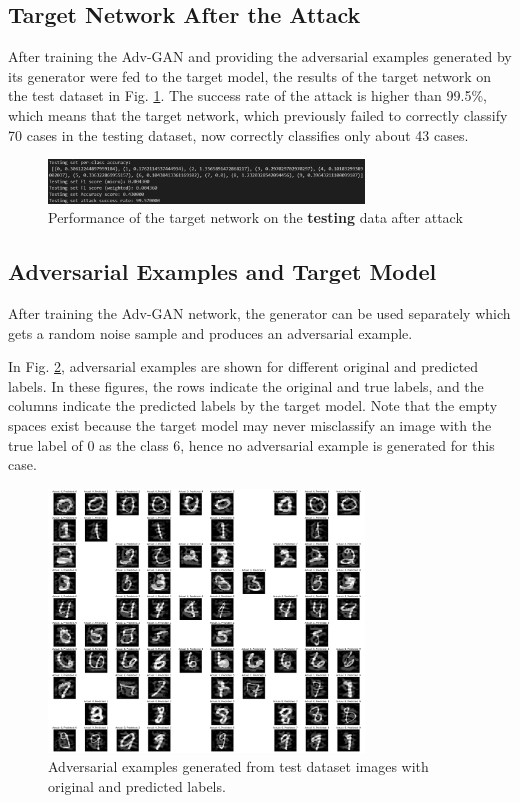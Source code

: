 \documentclass[lettersize,journal]{IEEEtran}
\begin{document}
\subsection*{Target Network After the Attack}
After training the Adv-GAN  and providing the adversarial examples generated by its generator  were fed to the target model, the results of the target network on the test dataset in Fig. \ref{testset_statistics}. The success rate of the attack is higher than 99.5\%, which means that the target network, which previously failed to correctly classify 70 cases in the testing dataset, now correctly classifies only about 43 cases.

\begin{figure}[!t]
\centering
\includegraphics[width=3.3in]{testset_statistics.PNG}
\caption{Performance of the target network on the \textbf{testing} data after attack}
\label{testset_statistics}
\end{figure}

\subsection*{Adversarial Examples and Target Model}
After training the Adv-GAN network, the generator can be used separately which gets a random noise sample and produces an adversarial example.

In Fig. \ref{testset_imgs_matrix}, adversarial examples are shown for different original and predicted labels. In these figures, the rows indicate the original and true labels, and the columns indicate the predicted labels by the target model. Note that the empty spaces exist because the target model may never misclassify an image with the true label of 0 as the class 6, hence no adversarial example is generated for this case.

\begin{figure}[!t]
\centering
\includegraphics[width=3.3in]{testset_imgs_matrix.PNG}
\caption{Adversarial examples generated from test dataset images with original and predicted labels.}
\label{testset_imgs_matrix}
\end{figure}
\end{document}
